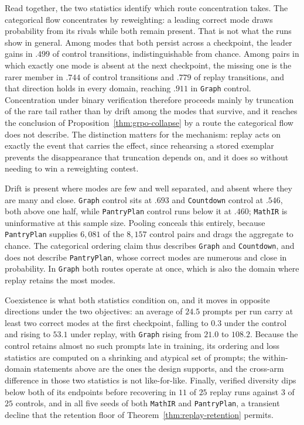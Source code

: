 Read together, the two statistics identify which route concentration takes. The
categorical flow concentrates by reweighting: a leading correct mode draws
probability from its rivals while both remain present. That is not what the runs
show in general. Among modes that both persist across a checkpoint, the leader
gains in $.499$ of control transitions, indistinguishable from chance. Among
pairs in which exactly one mode is absent at the next checkpoint, the missing one
is the rarer member in $.744$ of control transitions and $.779$ of replay
transitions, and that direction holds in every domain, reaching $.911$ in
\texttt{Graph} control. Concentration under binary verification therefore
proceeds mainly by truncation of the rare tail rather than by drift among the
modes that survive, and it reaches the conclusion of
Proposition~\ref{thm:grpo-collapse} by a route the categorical flow does not
describe. The distinction matters for the mechanism: replay acts on exactly the
event that carries the effect, since rehearsing a stored exemplar prevents the
disappearance that truncation depends on, and it does so without needing to win
a reweighting contest.

Drift is present where modes are few and well separated, and absent where they
are many and close. \texttt{Graph} control sits at $.693$ and \texttt{Countdown}
control at $.546$, both above one half, while \texttt{PantryPlan} control runs
below it at $.460$; \texttt{MathIR} is uninformative at this sample size. Pooling
conceals this entirely, because \texttt{PantryPlan} supplies $6{,}081$ of the
$8{,}157$ control pairs and drags the aggregate to chance. The categorical
ordering claim thus describes \texttt{Graph} and \texttt{Countdown}, and does not
describe \texttt{PantryPlan}, whose correct modes are numerous and close in
probability. In \texttt{Graph} both routes operate at once, which is also the
domain where replay retains the most modes.

Coexistence is what both statistics condition on, and it moves in opposite
directions under the two objectives: an average of $24.5$ prompts per run carry
at least two correct modes at the first checkpoint, falling to $0.3$ under the
control and rising to $53.1$ under replay, with \texttt{Graph} rising from $21.0$
to $108.2$. Because the control retains almost no such prompts late in training,
its ordering and loss statistics are computed on a shrinking and atypical set of
prompts; the within-domain statements above are the ones the design supports, and
the cross-arm difference in those two statistics is not like-for-like. Finally,
verified diversity dips below both of its endpoints before recovering in $11$ of
$25$ replay runs against $3$ of $25$ controls, and in all five seeds of both
\texttt{MathIR} and \texttt{PantryPlan}, a transient decline that the
retention floor of Theorem~\ref{thm:replay-retention} permits.

